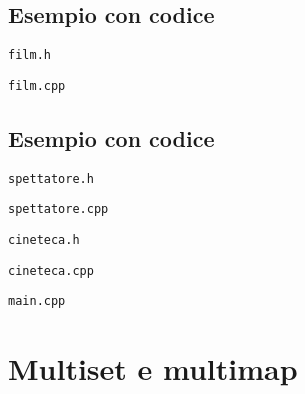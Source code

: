 \documentclass[xcolor={dvipsnames, svgnames, x11names, table}, 10pt]{beamer}
\begin{document}
\subsection{Esempio con codice}

\begin{frame}{\texttt{film.h}}
    
    
\end{frame}

\begin{frame}{\texttt{film.cpp}}
    
    
\end{frame}

\subsection{Esempio con codice}

\begin{frame}{\texttt{spettatore.h}}
    
    
\end{frame}

\begin{frame}{\texttt{spettatore.cpp}}
    
    
\end{frame}

\begin{frame}{\texttt{cineteca.h}}
    
    
\end{frame}

\begin{frame}{\texttt{cineteca.cpp}}
    
    
\end{frame}

\begin{frame}{\texttt{main.cpp}}
    
    
\end{frame}


\section{Multiset e multimap}
\end{document}
